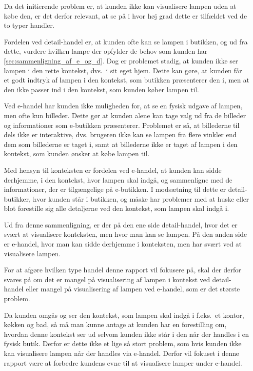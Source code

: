 Da det initierende problem er, at kunden ikke kan visualisere lampen uden at købe den, er det derfor relevant, at se på i hvor høj grad dette er tilfældet ved de to typer handler.

Fordelen ved detail-handel er, at kunden ofte kan se lampen i butikken, og ud fra dette, vurdere hvilken lampe der opfylder de behov som kunden har \ref{sec:sammenligning_af_e_og_d}. Dog er problemet stadig, at kunden ikke ser lampen i den rette kontekst, dvs.\ i sit eget hjem. Dette kan gøre, at kunden får et godt indtryk af lampen i den kontekst, som butikken præsenterer den i, men at den ikke passer ind i den kontekst, som kunden køber lampen til.

Ved e-handel har kunden ikke muligheden for, at se en fysisk udgave af lampen, men ofte kun billeder. Dette gør at kunden alene kan tage valg ud fra de billeder og informationer som e-butikken præsenterer. Problemet er så, at billederne til dels ikke er interaktive, dvs. brugeren ikke kan se lampen fra flere vinkler end dem som billederne er taget i, samt at billederne ikke er taget af lampen i den kontekst, som kunden ønsker at købe lampen til. 

Med hensyn til konteksten er fordelen ved e-handel, at kunden kan sidde derhjemme, i den kontekst, hvor lampen skal indgå, og sammenligne med de informationer, der er tilgængelige på e-butikken. I modsætning til dette er detail-butikker, hvor kunden står i butikken, og måske har problemer med at huske eller blot forestille sig alle detaljerne ved den kontekst, som lampen skal indgå i.

Ud fra denne sammenligning, er der på den ene side detail-handel, hvor det er svært at visualisere konteksten, men hvor man kan se lampen. På den anden side er e-handel, hvor man kan sidde derhjemme i konteksten, men har svært ved at visualisere lampen. 

For at afgøre hvilken type handel denne rapport vil fokusere på, skal der derfor svares på om det er mangel på visualisering af lampen i kontekst ved detail-handel eller mangel på visualisering af lampen ved e-handel, som er det største problem.

Da kunden omgås og ser den kontekst, som lampen skal indgå i f.eks.\ et kontor, køkken og bad, så må man kunne antage at kunden har en forestilling om, hvordan denne kontekst ser ud selvom kunden ikke står i den når der handles i en fysisk butik. Derfor er dette ikke et lige så stort problem, som hvis kunden ikke kan visualisere lampen når der handles via e-handel. Derfor vil fokuset i denne rapport være at forbedre kundens evne til at visualisere lamper under e-handel.

